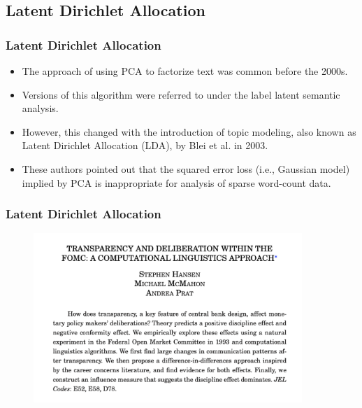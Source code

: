 \documentclass[
  shownotes,
  xcolor={svgnames},
  hyperref={colorlinks,citecolor=DarkBlue,linkcolor=DarkRed,urlcolor=DarkBlue}
  , aspectratio=169]{beamer}
\begin{document}
\subsection{Latent Dirichlet Allocation}
\begin{frame}
\frametitle{Latent Dirichlet Allocation}

\begin{itemize}


\item The approach of using PCA to factorize text was common before the 2000s. 
\medskip
\item Versions of this algorithm were referred to under the label latent semantic analysis. 
\medskip
\item However, this changed with the introduction of topic modeling, also known as Latent Dirichlet Allocation (LDA), by Blei et al. in 2003. 
\medskip
\item These authors pointed out that the squared error loss (i.e., Gaussian model) implied by PCA is inappropriate for analysis of sparse word-count data. 
\medskip

\end{itemize}

\end{frame}
\begin{frame}
\frametitle{Latent Dirichlet Allocation}

\begin{figure}[H] \centering
            \captionsetup{justification=centering}
              \includegraphics[width=4in]{figures/hansen1.png}
              
 \end{figure}

 \end{frame}
\end{document}
